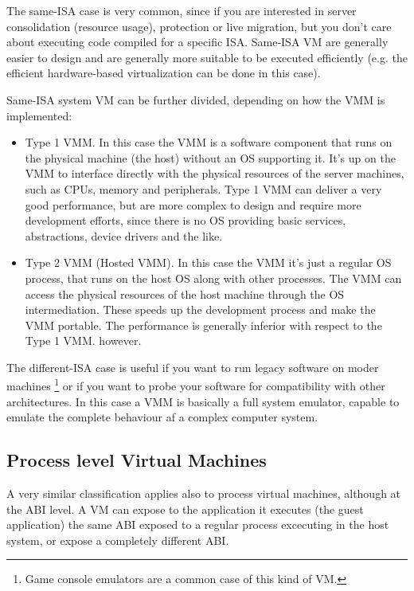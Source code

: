 The same-ISA case is very common, since if you are interested in server consolidation (resource usage), protection or live 
migration, but you don't care about executing code compiled for a specific ISA. Same-ISA VM are generally easier to design and 
are generally more suitable to be executed efficiently (e.g. the efficient hardware-based virtualization can be done in this case).

Same-ISA system VM can be further divided, depending on how the VMM is implemented:
\begin{itemize}
    \item Type 1 VMM. In this case the VMM is a software component that runs on the physical machine (the host) without an OS
	  supporting it. It's up on the VMM to interface directly with the physical resources of the server machines, such as
	  CPUs, memory and peripherals. Type 1 VMM can deliver a very good performance, but are more complex to design and require
	  more development efforts, since there is no OS providing basic services, abstractions, device drivers and the like.
	  
    \item Type 2 VMM (Hosted VMM). In this case the VMM it's just a regular OS process, that runs on the host OS along with other
	  processes. The VMM can access the physical resources of the host machine through the OS intermediation. These speeds up
	  the development process and make the VMM portable. The performance is generally inferior with respect to the Type 1 VMM.
	  however.
\end{itemize}


\vspace{0.5cm}

The different-ISA case is useful if you want to run legacy software on moder machines \footnote{Game console emulators are a common case of this
kind of VM.} or if you want to probe your software for compatibility with other architectures. In this case a VMM is basically a
full system emulator, capable to emulate the complete behaviour af a complex computer system.


\subsection{Process level Virtual Machines}
A very similar classification applies also to process virtual machines, although at the ABI level. A VM can expose to the application
it executes (the guest application) the same ABI exposed to a regular process excecuting in the host system, or expose a 
completely different ABI.

